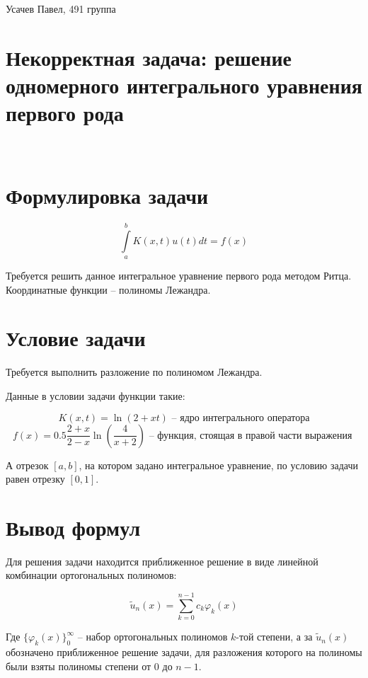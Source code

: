 \documentclass[12pt,a4paper]{article}
\begin{document}
\begin{flushleft}
\large Усачев Павел, 491 группа
\end{flushleft}

\section*{Некорректная задача: решение одномерного интегрального уравнения первого рода}


\

\section{Формулировка задачи}

\begin{equation}
 \int\limits_a^b K(x,t) u(t) dt = f(x)
\end{equation}

Требуется решить данное интегральное уравнение первого рода методом Ритца. Координатные функции -- полиномы Лежандра.

\section{Условие задачи}

Требуется выполнить разложение по полиномом Лежандра.

Данные в условии задачи функции такие:

$$ K(x,t) = \ln (2 + xt) \text{ \ \ -- \  ядро интегрального оператора} $$ 
$$ f(x) = 0.5\frac{2+x}{2-x} \ln \left ( \frac{4}{x+2} \right )
  \text{ \ \ -- \ функция, стоящая в правой части выражения } 
$$

А отрезок $[a,b]$, на котором задано интегральное уравнение, по условию задачи равен отрезку $[0,1]$.



\section{Вывод формул}

Для решения задачи находится приближенное решение в виде линейной комбинации ортогональных полиномов:
 
\begin{equation}
 \tilde u_n(x) = \sum \limits_{k=0}^{n-1} c_k \varphi_k(x)
\end{equation}

Где $\{ \varphi_k(x) \}_0^{\infty}$ -- набор ортогональных полиномов $k$-той степени, а за $\tilde u_n(x) $ обозначено приближенное решение задачи, для разложения которого на полиномы были взяты полиномы степени от 0 до $n-1$.
\end{document}
